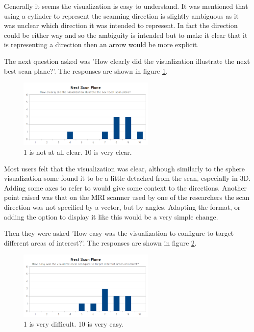 Generally it seems the visualization is easy to understand. It was mentioned that using a cylinder to represent the scanning direction is slightly ambiguous as it was unclear which direction it was intended to represent. In fact the direction could be either way and so the ambiguity is intended but to make it clear that it is representing a direction then an arrow would be more explicit.

The next question asked was 'How clearly did the visualization illustrate the next best scan plane?'. The responses are shown in figure \ref{fig:eval_next_scan_plane_q2}.

\begin{figure}[h]
    \centering
  \includegraphics[width=0.6\textwidth]{images/evaluation/graph_next_scan_plane_2.png}
    \caption{1 is not at all clear. 10 is very clear.}\label{fig:eval_next_scan_plane_q2}
\end{figure}

Most users felt that the visualization was clear, although similarly to the sphere visualization some found it to be a little detached from the scan, especially in 3D. Adding some axes to refer to would give some context to the directions. Another point raised was that on the MRI scanner used by one of the researchers the scan direction was not specified by a vector, but by angles. Adapting the format, or adding the option to display it like this would be a very simple change.

Then they were asked 'How easy was the visualization to configure to target different areas of interest?'. The responses are shown in figure \ref{fig:eval_next_scan_plane_q3}.

\begin{figure}[h]
    \centering
  \includegraphics[width=0.6\textwidth]{images/evaluation/graph_next_scan_plane_3.png}
    \caption{1 is very difficult. 10 is very easy.}\label{fig:eval_next_scan_plane_q3}
\end{figure}

